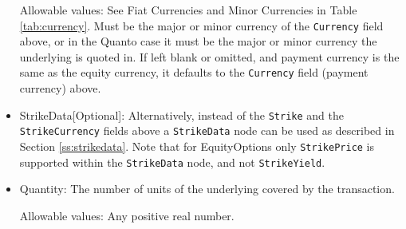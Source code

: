 \begin{itemize}
	Allowable values: See Fiat Currencies and Minor Currencies in Table
	\ref{tab:currency}.	Must be the major or minor currency of the \lstinline!Currency!
	field above, or in the Quanto case it must be the major or minor currency the underlying is quoted in. If left blank or omitted, and payment currency is the same as the equity currency, it defaults to the \lstinline!Currency! field (payment currency) above.

	
	\item StrikeData[Optional]: Alternatively, instead of the \lstinline!Strike! and the \lstinline!StrikeCurrency! fields above a \lstinline!StrikeData! node can be used as described in Section \ref{ss:strikedata}. Note that for EquityOptions only \lstinline!StrikePrice!  is supported within the \lstinline!StrikeData! node, and not \lstinline!StrikeYield!. 
	
	\item Quantity: The number of units of the underlying covered by the transaction. 
	
	Allowable values: Any positive real number.
\end{itemize}
